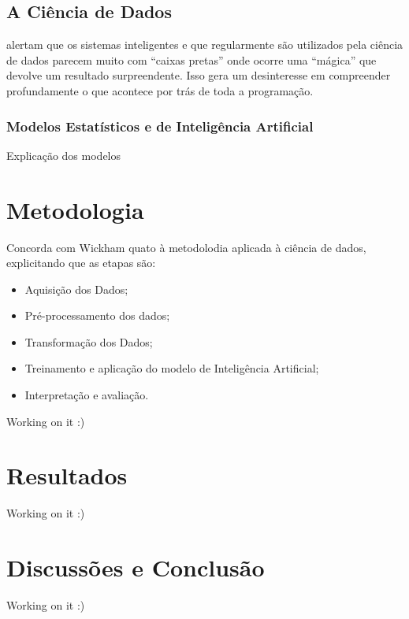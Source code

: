 \documentclass[
]{book}
\providecommand{\tightlist}{%
  \setlength{\itemsep}{0pt}\setlength{\parskip}{0pt}}
\begin{document}
\hypertarget{a-ciuxeancia-de-dados}{%
\section{A Ciência de Dados}\label{a-ciuxeancia-de-dados}}

\citet{Waltl2018} alertam que os sistemas inteligentes e que regularmente são utilizados pela ciência de dados parecem muito com ``caixas pretas'' onde ocorre uma ``mágica'' que devolve um resultado surpreendente. Isso gera um desinteresse em compreender profundamente o que acontece por trás de toda a programação.

\hypertarget{modelos-estatuxedsticos-e-de-inteliguxeancia-artificial}{%
\subsection{Modelos Estatísticos e de Inteligência Artificial}\label{modelos-estatuxedsticos-e-de-inteliguxeancia-artificial}}

Explicação dos modelos

\hypertarget{metodologia}{%
\chapter{Metodologia}\label{metodologia}}

\citet{Waltl2018} Concorda com Wickham quato à metodolodia aplicada à ciência de dados, explicitando que as etapas são:

\begin{itemize}
\tightlist
\item
  Aquisição dos Dados;
\item
  Pré-processamento dos dados;
\item
  Transformação dos Dados;
\item
  Treinamento e aplicação do modelo de Inteligência Artificial;
\item
  Interpretação e avaliação.
\end{itemize}

Working on it :)

\hypertarget{resultados}{%
\chapter{Resultados}\label{resultados}}

Working on it :)

\hypertarget{discussuxf5es-e-conclusuxe3o}{%
\chapter{Discussões e Conclusão}\label{discussuxf5es-e-conclusuxe3o}}

Working on it :)

  
\end{document}
